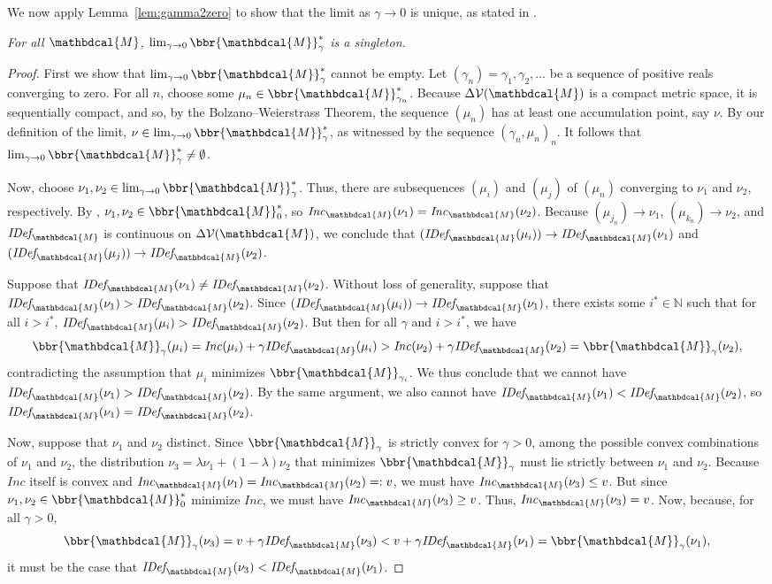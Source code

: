 \documentclass[letterpaper]{article} %
\makeatletter
\theoremstyle{plain}
\theoremstyle{definition}
\theoremstyle{remark}
\newcommand{\restate}[2]
	{\medskip\par\noindent{\bf \expandarg\Cref{thmt@@#1}.}%
 	\noindent\begingroup\em #2 \endgroup\par\smallskip}
\newcommand{\V}{\mathcal V}
\newcommand{\dg}[1]{\mathbdcal{#1}}
\newcommand{\IDef}[1]{\mathit{IDef}_{\!#1}}
\newcommand\Inc{\mathit{Inc}}
\makeatother
\begin{document}
We now apply Lemma~\ref{lem:gamma2zero} to show that the limit as
$\gamma \to 
0$ is unique, as stated in . 
\restate{prop:limit-uniq}{
	For all $\dg M$, $\lim_{\gamma\to0}\bbr{\dg M}_\gamma^*$ is a singleton.
}
\begin{proof}
First we show that $\lim_{\gamma \to 0}\bbr{\dg M}_\gamma^*$ cannot be empty.
Let $(\gamma_n) = \gamma_1, \gamma_2, \ldots$ be a sequence of
positive reals 
converging to zero.  For all $n$, choose some $\mu_n \in \bbr{\dg
M}_{\gamma_n}^*$. Because $\Delta\V(\dg M)$ is a compact metric
space, it is sequentially compact, and so, by the
Bolzano–Weierstrass Theorem, the sequence $(\mu_n)$ has at least one
accumulation point, say $\nu$. By our definition of the limit, $\nu \in
\lim_{\gamma\to0}\bbr{\dg M}_\gamma^*$, as witnessed by the sequence
$(\gamma_n, \mu_n)_n$.  It follows that $\lim_{\gamma\to0}\bbr{\dg
  M}_\gamma^* \ne \emptyset$.

Now, choose $\nu_1, \nu_2  \in  \lim_{\gamma\to0}\bbr{\dg
  M}_\gamma^*$. 
Thus, there are subsequences $(\mu_{i})$ and $(\mu_{j})$ of
$(\mu_n)$ converging
to $\nu_1$ and $\nu_2$, respectively.
By , $\nu_1, \nu_2 \in \bbr{\dg M}_0^*$, so
$\Inc_{\dg M}(\nu_1) = \Inc_{\dg M}(\nu_2)$.  
Because  $(\mu_{j_n}) \to \nu_1$, $(\mu_{k_n}) \to \nu_2$, and
$\IDef{\dg M}$ is
continuous on $\Delta\V(\dg M)$,
we conclude that  
$(\IDef{\dg M}(\mu_{i}))\to \IDef{\dg M}(\nu_1)$ and
$(\IDef{\dg M}(\mu_{j}))\to \IDef{\dg M}(\nu_2)$.

Suppose that $\IDef{\dg
M}(\nu_1) \neq \IDef{\dg M}(\nu_2)$. Without loss of generality,
suppose that $\IDef{\dg M}(\nu_1) > \IDef{\dg M}(\nu_2)$. 
Since $(\IDef{\dg M}(\mu_{i})) \to \IDef{\dg M}(\nu_1)$, there exists some $i^*
\in \mathbb N$ such that for all $i > i^*$,  
$ \IDef{\dg M}(\mu_{i}) >  \IDef{\dg M}(\nu_2) $.
But then for all $\gamma$ and $i > i^*$, we have 
\[ \bbr{\dg M}_\gamma(\mu_i) = \Inc(\mu_i) + \gamma\IDef{\dg M}(\mu_i)
> \Inc(\nu_2)  
+ \gamma \IDef{\dg M}(\nu_2) = \bbr{\dg M}_\gamma(\nu_2),\]
contradicting the assumption that $\mu_{i}$ minimizes
$\bbr{\dg M}_{\gamma_{i}}$. We thus conclude that we
cannot have $\IDef{\dg M}(\nu_1) > \IDef{\dg M}(\nu_2)$.  By the same
argument, we also cannot have $\IDef{\dg M}(\nu_1) < \IDef{\dg
  M}(\nu_2)$, so $\IDef{\dg M}(\nu_1) =\IDef{\dg M}(\nu_2)$.  
  
Now, suppose that $\nu_1$ and $\nu_2$ distinct. Since $\bbr{\dg M}_\gamma$
is strictly convex for $\gamma > 0$, among the possible convex
combinations of $\nu_1$ and $\nu_2$, the distribution $\nu_3 = \lambda
\nu_1 + (1-\lambda) \nu_2$ that minimizes $\bbr{\dg M}_\gamma$ must
lie strictly between $\nu_1$ and $\nu_2$. 
Because $\Inc$ itself is convex and $\Inc_{\dg M}(\nu_1) = \Inc_{\dg
  M}(\nu_2) =: v$, we must have $\Inc_{\dg M}(\nu_3) \le v$. 
But since
$\nu_1,\nu_2 \in \bbr{\dg M}_0^*$ minimize $\Inc$,
we must have $\Inc_{\dg M}(\nu_3) \ge v$.
Thus, $\Inc_{\dg M}(\nu_3) = v$. 
Now, because, for all  $\gamma > 0$,
\[ \bbr{\dg M}_\gamma(\nu_3) = v + \gamma \IDef{\dg M}(\nu_3) 
 	< v + \gamma \IDef{\dg M}(\nu_1) = \bbr{\dg M}_\gamma(\nu_1), \] 
it must be the case that $\IDef{\dg M}(\nu_3) < \IDef{\dg M}(\nu_1)$. 
        

\end{proof}
\end{document}
